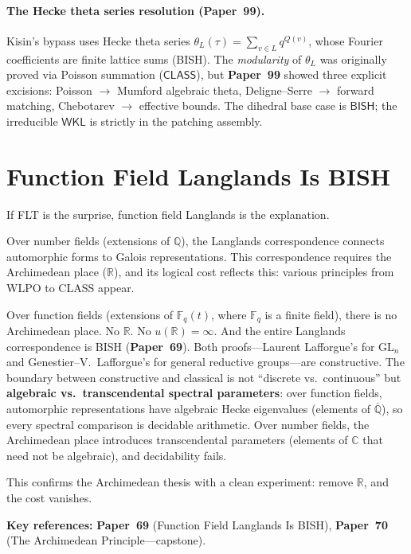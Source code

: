 \documentclass[11pt,twoside,openany]{report}
\theoremstyle{remark}
\newcommand{\BISH}{\textsf{BISH}}
\newcommand{\WKL}{\textsf{WKL}}
\newcommand{\WLPO}{\textsf{WLPO}}
\newcommand{\CLASS}{\textsf{CLASS}}
\newcommand{\paperref}[1]{\textbf{Paper~#1}}
\begin{document}
\paragraph{The Hecke theta series resolution (\paperref{99}).} Kisin's bypass uses Hecke theta series $\theta_L(\tau) = \sum_{v \in L} q^{Q(v)}$, whose Fourier coefficients are finite lattice sums (\BISH). The \emph{modularity} of $\theta_L$ was originally proved via Poisson summation ($\CLASS$), but \paperref{99} showed three explicit excisions: Poisson $\to$ Mumford algebraic theta, Deligne--Serre $\to$ forward matching, Chebotarev $\to$ effective bounds. The dihedral base case is $\BISH$; the irreducible $\WKL$ is strictly in the patching assembly.


\section{Function Field Langlands Is \BISH}

If FLT is the surprise, function field Langlands is the explanation.

Over number fields (extensions of $\mathbb{Q}$), the Langlands correspondence connects automorphic forms to Galois representations. This correspondence requires the Archimedean place ($\mathbb{R}$), and its logical cost reflects this: various principles from \WLPO{} to \CLASS{} appear.

Over function fields (extensions of $\mathbb{F}_q(t)$, where $\mathbb{F}_q$ is a finite field), there is no Archimedean place. No $\mathbb{R}$. No $u(\mathbb{R}) = \infty$. And the entire Langlands correspondence is \BISH{} (\paperref{69}). Both proofs---Laurent Lafforgue's for $\mathrm{GL}_n$ and Genestier--V.~Lafforgue's for general reductive groups---are constructive. The boundary between constructive and classical is not ``discrete vs.\ continuous'' but \textbf{algebraic vs.\ transcendental spectral parameters}: over function fields, automorphic representations have algebraic Hecke eigenvalues (elements of $\overline{\mathbb{Q}}$), so every spectral comparison is decidable arithmetic. Over number fields, the Archimedean place introduces transcendental parameters (elements of $\mathbb{C}$ that need not be algebraic), and decidability fails.

This confirms the Archimedean thesis with a clean experiment: remove $\mathbb{R}$, and the cost vanishes.

\begin{keyrefbox}
\textbf{Key references:} \paperref{69} (Function Field Langlands Is \BISH), \paperref{70} (The Archimedean Principle---capstone).
\end{keyrefbox}
\end{document}
